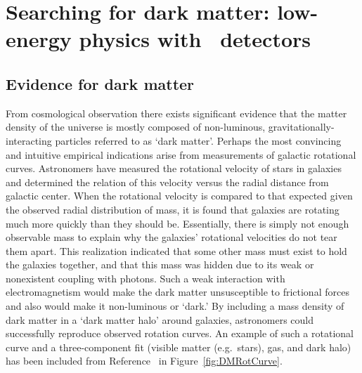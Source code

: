 

	\section{Searching for dark matter: low-energy physics with \ppc~detectors}
	
		\subsection{Evidence for dark matter}
	From cosmological observation there exists significant evidence that the matter density of the universe is mostly composed of non-luminous, gravitationally-interacting particles referred to as `dark matter'.  Perhaps the most convincing and intuitive empirical indications arise from measurements of galactic rotational curves.  Astronomers have measured the rotational velocity of stars in galaxies and determined the relation of this velocity versus the radial distance from galactic center.  When the rotational velocity is compared to that expected given the observed radial distribution of mass, it is found that galaxies are rotating much more quickly than they should be.  Essentially, there is simply not enough observable mass to explain why the galaxies' rotational velocities do not tear them apart.  This realization indicated that some other mass must exist to hold the galaxies together, and that this mass was hidden due to its weak or nonexistent coupling with photons.  Such a weak interaction with electromagnetism would make the dark matter unsusceptible to frictional forces and also would make it non-luminous or `dark.'  By including a mass density of dark matter in a `dark matter halo' around galaxies, astronomers could successfully reproduce observed rotation curves.  An example of such a rotational curve and a three-component fit (visible matter (e.g.~stars), gas, and dark halo) has been included from Reference~\cite{Begeman:1991iy} in Figure~\ref{fig:DMRotCurve}.

